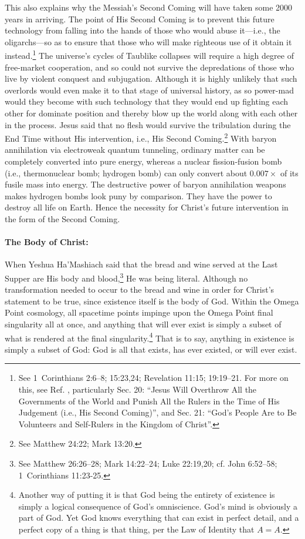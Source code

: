 \documentclass[letterpaper,12pt]{article}
\begin{document}
This also explains why the Messiah's Second Coming will have taken some 2000 years in arriving. The point of His Second Coming is to prevent this future technology from falling into the hands of those who would abuse it---i.e., the oligarchs---so as to ensure that those who will make righteous use of it obtain it instead.\footnote{See 1~Corinthians 2:6--8; 15:23,24; Revelation 11:15; 19:19--21. For more on this, see Ref. , particularly Sec. 20: ``Jesus Will Overthrow All the Governments of the World and Punish All the Rulers in the Time of His Judgement (i.e., His Second Coming)'', and Sec. 21: ``God's People Are to Be Volunteers and Self-Rulers in the Kingdom of Christ''.} The universe's cycles of Taublike collapses will require a high degree of free-market cooperation, and so could not survive the depredations of those who live by violent conquest and subjugation. Although it is highly unlikely that such overlords would even make it to that stage of universal history, as so power-mad would they become with such technology that they would end up fighting each other for dominate position and thereby blow up the world along with each other in the process. Jesus said that no flesh would survive the tribulation during the End Time without His intervention, i.e., His Second Coming.\footnote{See Matthew 24:22; Mark 13:20.} With baryon annihilation via electroweak quantum tunneling, ordinary matter can be completely converted into pure energy, whereas a nuclear fission-fusion bomb (i.e., thermonuclear bomb; hydrogen bomb) can only convert about \( 0.007 \times \) of its fusile mass into energy. The destructive power of baryon annihilation weapons makes hydrogen bombs look puny by comparison. They have the power to destroy all life on Earth. Hence the necessity for Christ's future intervention in the form of the Second Coming.

\paragraph{The Body of Christ:}
\label{parag:BodyOfChrist}

When Yeshua Ha'Mashiach said that the bread and wine served at the Last Supper are His body and blood,\footnote{See Matthew 26:26--28; Mark 14:22--24; Luke 22:19,20; cf. John 6:52--58; 1~Corinthians 11:23-25.} He was being literal. Although no transformation needed to occur to the bread and wine in order for Christ's statement to be true, since existence itself is the body of God. Within the Omega Point cosmology, all spacetime points impinge upon the Omega Point final singularity all at once, and anything that will ever exist is simply a subset of what is rendered at the final singularity.\footnote{Another way of putting it is that God being the entirety of existence is simply a logical consequence of God's omniscience. God's mind is obviously a part of God. Yet God knows everything that can exist in perfect detail, and a perfect copy of a thing is that thing, per the Law of Identity that \( A = A \).} That is to say, anything in existence is simply a subset of God: God is all that exists, has ever existed, or will ever exist.
\end{document}
